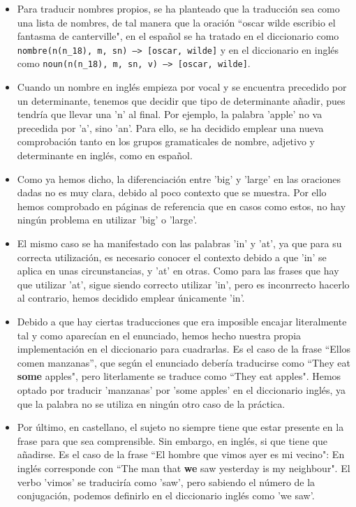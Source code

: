 \documentclass[a4paper]{article}
\begin{document}
        \begin{itemize}

            \item Para traducir nombres propios, se ha planteado que la traducción sea como una lista de nombres, de tal manera que la oración ``oscar wilde escribio el fantasma de canterville", en el español se ha tratado en el diccionario como \texttt{nombre(n(n\_18), m, sn) --> [oscar, wilde]} y en el diccionario en inglés como \texttt{noun(n(n\_18), m, sn, v) --> [oscar, wilde]}.

            \item Cuando un nombre en inglés empieza por vocal y se encuentra precedido por un determinante, tenemos que decidir que tipo de determinante añadir, pues tendría que llevar una 'n' al final. Por ejemplo, la palabra 'apple' no va precedida por 'a', sino 'an'. Para ello, se ha decidido emplear una nueva comprobación tanto en los grupos gramaticales de nombre, adjetivo y determinante en inglés, como en español.

            \item Como ya hemos dicho, la diferenciación entre 'big' y 'large' en las oraciones dadas no es    muy clara, debido al poco contexto que se muestra. Por ello hemos comprobado en páginas de referencia que en casos como estos, no hay ningún problema en utilizar 'big' o 'large'.

            \item El mismo caso se ha manifestado con las palabras 'in' y 'at', ya que para su correcta utilización, es necesario conocer el contexto debido a que 'in' se aplica en unas circunstancias, y 'at' en otras. Como para las frases que hay que utilizar 'at', sigue siendo correcto utilizar 'in', pero es inconrrecto hacerlo al contrario, hemos decidido emplear únicamente 'in'.

            \item Debido a que hay ciertas traducciones que era imposible encajar literalmente tal y como aparecían en el enunciado, hemos hecho nuestra propia implementación en el diccionario para cuadrarlas. Es el caso de la frase ``Ellos comen manzanas'', que según el enunciado debería traducirse como ``They eat \textbf{some} apples", pero literlamente se traduce como ``They eat apples". Hemos optado por traducir 'manzanas' por 'some apples' en el diccionario inglés, ya que la palabra no se utiliza en ningún otro caso de la práctica.

            \item Por último, en castellano, el sujeto no siempre tiene que estar presente en la frase para que sea comprensible. Sin embargo, en inglés, si que tiene que añadirse. Es el caso de la frase ``El hombre que vimos ayer es mi vecino": En inglés corresponde con ``The man that \textbf{we} saw yesterday is my neighbour".  El verbo 'vimos' se traduciría como 'saw', pero sabiendo el número de la conjugación, podemos definirlo en el diccionario inglés como 'we saw'.

        \end{itemize}

    
    
\end{document}
